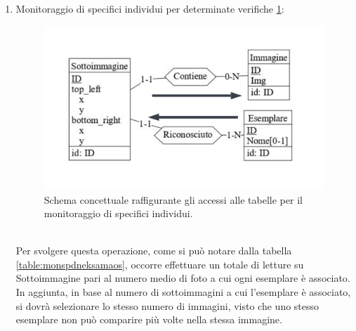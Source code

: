 \documentclass[a4paper,final,12pt]{report}
\begin{document}
\begin{enumerate}
\item Monitoraggio di specifici individui per determinate verifiche \ref{figura:accessipertabellemonitoraggio}:
\begin{figure}[hbtp]
\centering
\includegraphics[scale=1]{img_concettuale/individuo.png}
\caption{Schema concettuale raffigurante gli accessi alle tabelle per il monitoraggio di specifici individui.}
\label{figura:accessipertabellemonitoraggio}
\end{figure}
\\Per svolgere questa operazione, come si può notare dalla tabella \ref{table:monspdneksamaos}, occorre effettuare un totale di letture su Sottoimmagine pari al numero medio di foto a cui ogni esemplare è associato. In aggiunta, in base al numero di sottoimmagini a cui l'esemplare è associato, si dovrà selezionare lo stesso numero di immagini, visto che uno stesso esemplare non può comparire più volte nella stessa immagine.
\begin{table}[hbtp]
\centering
{}
\caption{Tabella degli accessi per il monitoraggio di individui marini.}
\label{table:monspdneksamaos}
\end{table}


\end{enumerate}
\end{document}
